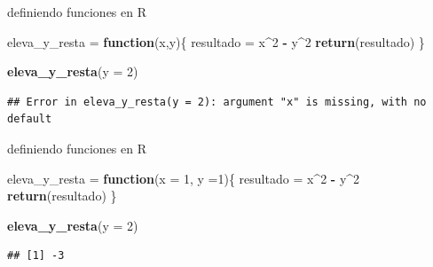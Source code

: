 \documentclass[ignorenonframetext,]{beamer}
\newenvironment{Shaded}{\begin{snugshade}}{\end{snugshade}}
\newcommand{\ControlFlowTok}[1]{\textcolor[rgb]{0.13,0.29,0.53}{\textbf{#1}}}
\newcommand{\DataTypeTok}[1]{\textcolor[rgb]{0.13,0.29,0.53}{#1}}
\newcommand{\DecValTok}[1]{\textcolor[rgb]{0.00,0.00,0.81}{#1}}
\newcommand{\KeywordTok}[1]{\textcolor[rgb]{0.13,0.29,0.53}{\textbf{#1}}}
\newcommand{\NormalTok}[1]{#1}
\newcommand{\OperatorTok}[1]{\textcolor[rgb]{0.81,0.36,0.00}{\textbf{#1}}}
\newcommand{\StringTok}[1]{\textcolor[rgb]{0.31,0.60,0.02}{#1}}
\begin{document}
\begin{frame}[fragile]{definiendo funciones en R}
\protect\hypertarget{definiendo-funciones-en-r-4}{}

\begin{Shaded}
\begin{Highlighting}[]
\NormalTok{eleva_y_resta =}\StringTok{ }\ControlFlowTok{function}\NormalTok{(x,y)\{}
\NormalTok{  resultado =}\StringTok{ }\NormalTok{x}\OperatorTok{^}\DecValTok{2} \OperatorTok{-}\StringTok{ }\NormalTok{y}\OperatorTok{^}\DecValTok{2}
  \KeywordTok{return}\NormalTok{(resultado)}
\NormalTok{\}}

\KeywordTok{eleva_y_resta}\NormalTok{(}\DataTypeTok{y =} \DecValTok{2}\NormalTok{)}
\end{Highlighting}
\end{Shaded}

\begin{verbatim}
## Error in eleva_y_resta(y = 2): argument "x" is missing, with no default
\end{verbatim}

\end{frame}

\begin{frame}[fragile]{definiendo funciones en R}
\protect\hypertarget{definiendo-funciones-en-r-5}{}

\begin{Shaded}
\begin{Highlighting}[]
\NormalTok{eleva_y_resta =}\StringTok{ }\ControlFlowTok{function}\NormalTok{(}\DataTypeTok{x =} \DecValTok{1}\NormalTok{, }\DataTypeTok{y =}\DecValTok{1}\NormalTok{)\{}
\NormalTok{  resultado =}\StringTok{ }\NormalTok{x}\OperatorTok{^}\DecValTok{2} \OperatorTok{-}\StringTok{ }\NormalTok{y}\OperatorTok{^}\DecValTok{2}
  \KeywordTok{return}\NormalTok{(resultado)}
\NormalTok{\}}

\KeywordTok{eleva_y_resta}\NormalTok{(}\DataTypeTok{y =} \DecValTok{2}\NormalTok{)}
\end{Highlighting}
\end{Shaded}

\begin{verbatim}
## [1] -3
\end{verbatim}

\end{frame}
\end{document}
